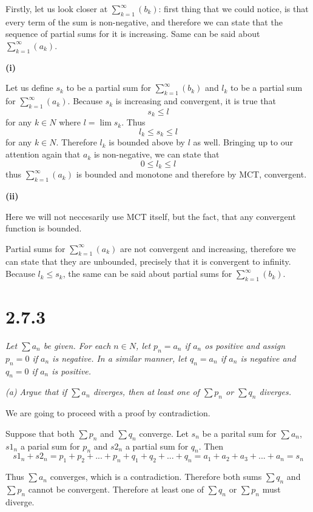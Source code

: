 \documentclass[11pt,oneside,titlepage]{book}
\begin{document}
Firstly, let us look closer at $\sum^{\infty}_{k = 1}(b_k)$: first
thing that we could
notice, is that every term of the sum is non-negative, and therefore
we can state that the sequence of partial sums for it  is increasing.
Same can be said about $\sum^{\infty}_{k = 1}(a_k)$.

\textbf{(i)}

Let us define  $s_k$ to be  a partial sum for
$\sum^{\infty}_{k = 1}(b_k)$ and $l_k$ to be a partial sum for
$\sum^{\infty}_{k = 1}(a_k)$. Because
$s_k$ is increasing and convergent, it is true that
$$s_k \leq l$$
for any $k \in N$ where $l = \lim s_k$. Thus
$$l_k \leq s_k \leq l$$
for any $k \in N$. Therefore $l_k$ is bounded above by $l$ as well.
Bringing up to our attention again that $a_k$ is non-negative, we can
state that
$$0 \leq l_k \leq l$$
thus $\sum^{\infty}_{k = 1}(a_k)$ is bounded and monotone and therefore by MCT,
convergent.

\textbf{(ii)}

Here we will not neccesarily use MCT itself, but the fact, that any convergent
function is bounded.

Partial sums for $\sum^{\infty}_{k = 1}(a_k)$ are not convergent and
increasing, therefore we can state that they are unbounded, precisely
that it is convergent to infinity. Because $l_k \leq s_k$, the same can be said
about partial sums for  $\sum^{\infty}_{k = 1}(b_k)$.

\section*{2.7.3}
\textit{Let $\sum a_n$ be given. For each $n \in N$, let $p_n = a_n$ if $a_n$
  os positive and assign $p_n = 0$ if $a_n$ is negative. In a similar manner,
  let $q_n = a_n$ if $a_n$ is negative and $q_n = 0$ if $a_n$ is positive. }

\textit{(a) Argue that if $\sum a_n$ diverges, then at least one of
  $\sum p_n$ or $\sum q_n$ diverges.}

We are going to proceed with a proof by contradiction.

Suppose that both $\sum p_n$ and  $\sum q_n$ converge. Let $s_n$ be
a parital sum for $\sum a_n$, $s1_n$ a parial sum for $p_n$ and $s2_n$ a
partial sum for $q_n$. Then
$$s1_n + s2_n = p_1 + p_2 + ... + p_n + q_1 + q_2 + ... + q_n =
a_1 + a_2 + a_3 + ... + a_n = s_n$$

Thus $\sum a_n$ converges, which is a contradiction. Therefore both
sums $\sum q_n$ and $\sum p_n$ cannot be convergent. Therefore at least one of
$\sum q_n$ or $\sum p_n$ must diverge.
\end{document}
